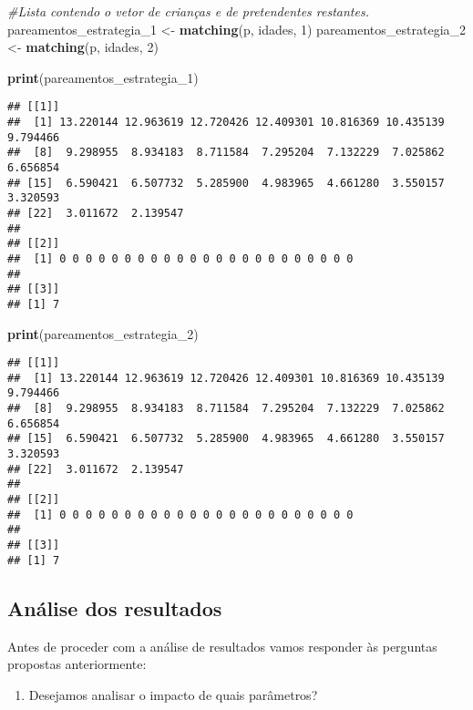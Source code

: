 \documentclass[]{book}
\newenvironment{Shaded}{\begin{snugshade}}{\end{snugshade}}
\newcommand{\KeywordTok}[1]{\textcolor[rgb]{0.13,0.29,0.53}{\textbf{{#1}}}}
\newcommand{\DecValTok}[1]{\textcolor[rgb]{0.00,0.00,0.81}{{#1}}}
\newcommand{\StringTok}[1]{\textcolor[rgb]{0.31,0.60,0.02}{{#1}}}
\newcommand{\CommentTok}[1]{\textcolor[rgb]{0.56,0.35,0.01}{\textit{{#1}}}}
\newcommand{\NormalTok}[1]{{#1}}
\providecommand{\tightlist}{%
  \setlength{\itemsep}{0pt}\setlength{\parskip}{0pt}}
\begin{document}
\begin{Shaded}
\begin{Highlighting}[]
\CommentTok{#Lista contendo o vetor de crianças e de pretendentes restantes.}
\NormalTok{pareamentos_estrategia_1 <-}\StringTok{ }\KeywordTok{matching}\NormalTok{(p, idades, }\DecValTok{1}\NormalTok{)}
\NormalTok{pareamentos_estrategia_2 <-}\StringTok{ }\KeywordTok{matching}\NormalTok{(p, idades, }\DecValTok{2}\NormalTok{)}

\KeywordTok{print}\NormalTok{(pareamentos_estrategia_1)}
\end{Highlighting}
\end{Shaded}

\begin{verbatim}
## [[1]]
##  [1] 13.220144 12.963619 12.720426 12.409301 10.816369 10.435139  9.794466
##  [8]  9.298955  8.934183  8.711584  7.295204  7.132229  7.025862  6.656854
## [15]  6.590421  6.507732  5.285900  4.983965  4.661280  3.550157  3.320593
## [22]  3.011672  2.139547
## 
## [[2]]
##  [1] 0 0 0 0 0 0 0 0 0 0 0 0 0 0 0 0 0 0 0 0 0 0 0
## 
## [[3]]
## [1] 7
\end{verbatim}

\begin{Shaded}
\begin{Highlighting}[]
\KeywordTok{print}\NormalTok{(pareamentos_estrategia_2)}
\end{Highlighting}
\end{Shaded}

\begin{verbatim}
## [[1]]
##  [1] 13.220144 12.963619 12.720426 12.409301 10.816369 10.435139  9.794466
##  [8]  9.298955  8.934183  8.711584  7.295204  7.132229  7.025862  6.656854
## [15]  6.590421  6.507732  5.285900  4.983965  4.661280  3.550157  3.320593
## [22]  3.011672  2.139547
## 
## [[2]]
##  [1] 0 0 0 0 0 0 0 0 0 0 0 0 0 0 0 0 0 0 0 0 0 0 0
## 
## [[3]]
## [1] 7
\end{verbatim}

\subsection{Análise dos resultados}\label{analise-dos-resultados-1}

Antes de proceder com a análise de resultados vamos responder às
perguntas propostas anteriormente:

\begin{enumerate}
\def\labelenumi{\arabic{enumi}.}
\tightlist
\item
  Desejamos analisar o impacto de quais parâmetros?
\end{enumerate}
\end{document}
